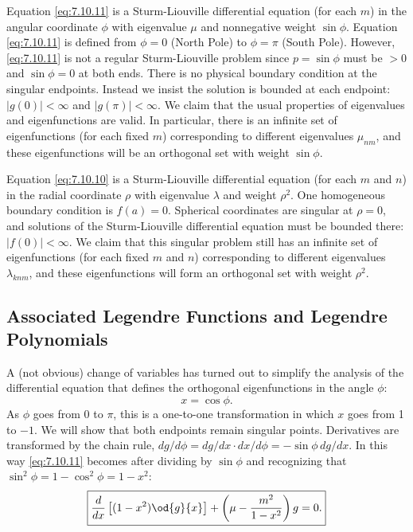 Equation \eqref{eq:7.10.11} is a Sturm-Liouville differential equation (for each $m$) in the angular coordinate $\phi$ with eigenvalue $\mu$ and nonnegative weight $\sin\phi$.  Equation \eqref{eq:7.10.11} is defined from $\phi = 0$ (North Pole) to $\phi = \pi$ (South Pole).  However, \eqref{eq:7.10.11} is not a regular Sturm-Liouville problem since $p = \sin\phi$ must be $> 0$ and $\sin\phi = 0$ at both ends.  There is no physical boundary condition at the singular endpoints.  Instead we insist the solution is bounded at each endpoint: $|g(0)| < \infty$ and $|g(\pi)| < \infty$.  We claim that the usual properties of eigenvalues and eigenfunctions are valid.  In particular, there is an infinite set of eigenfunctions (for each fixed $m$) corresponding to different eigenvalues $\mu_{nm}$, and these eigenfunctions will be an orthogonal set with weight $\sin\phi$.

Equation \eqref{eq:7.10.10} is a Sturm-Liouville differential equation (for each $m$ and $n$) in the radial coordinate $\rho$ with eigenvalue $\lambda$ and weight $\rho^2$.  One homogeneous boundary condition is $f(a) = 0$.  Spherical coordinates are singular at $\rho = 0$, and solutions of the Sturm-Liouville differential equation must be bounded there: $|f(0)| < \infty$.  We claim that this singular problem still has an infinite set of eigenfunctions (for each fixed $m$ and $n$) corresponding to different eigenvalues $\lambda_{knm}$, and these eigenfunctions will form an orthogonal set with weight $\rho^2$.

\subsection{Associated Legendre Functions and Legendre Polynomials}
\label{sec:7.10.3}

A (not obvious) change of variables has turned out to simplify the analysis of the differential equation that defines the orthogonal eigenfunctions in the angle $\phi$:
\begin{equation}
\boxed{x = \cos\phi.}
\label{eq:7.10.12}
\end{equation}
As $\phi$ goes from 0 to $\pi$, this is a one-to-one transformation in which $x$ goes from 1 to $-1$.  We will show that both endpoints remain singular points.  Derivatives are transformed by the chain rule, $dg/d\phi = dg/dx\cdot dx/d\phi = -\sin\phi\,dg/dx$.  In this way \eqref{eq:7.10.11} becomes after dividing by $\sin\phi$ and recognizing that $\sin^2\phi = 1 - \cos^2\phi = 1 - x^2$:
\begin{equation}
\boxed{\frac{d}{d x}\left[(1-x^2)\od{g}{x}\right] + \left(\mu - \frac{m^2}{1-x^2}\right)g = 0.}
\label{eq:7.10.13}
\end{equation}

